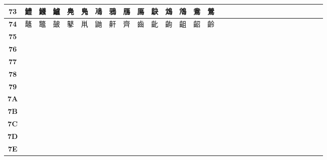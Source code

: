 \begin{table}[H]
\begin{tabular}{|Sc|Sc|Sc|Sc|Sc|Sc|Sc|Sc|Sc|Sc|Sc|Sc|Sc|Sc|Sc|}
\textbf{73} & 鱧 & 鱶 & 鱸 & 鳧 & 鳬 & 鳰 & 鴉 & 鴈 & 鳫 & 鴃 & 鴆 & 鴪 & 鴦 & 鶯 \\ \hline
\textbf{74} & 鼇 & 鼈 & 皷 & 鼕 & 鼡 & 鼬 & 鼾 & 齊 & 齒 & 齔 & 齣 & 齟 & 齠 & 齡 \\ \hline
\textbf{75} &  &  &  &  &  &  &  &  &  &  &  &  &  &  \\ \hline
\textbf{76} &  &  &  &  &  &  &  &  &  &  &  &  &  &  \\ \hline
\textbf{77} &  &  &  &  &  &  &  &  &  &  &  &  &  &  \\ \hline
\textbf{78} &  &  &  &  &  &  &  &  &  &  &  &  &  &  \\ \hline
\textbf{79} &  &  &  &  &  &  &  &  &  &  &  &  &  &  \\ \hline
\textbf{7A} &  &  &  &  &  &  &  &  &  &  &  &  &  &  \\ \hline
\textbf{7B} &  &  &  &  &  &  &  &  &  &  &  &  &  &  \\ \hline
\textbf{7C} &  &  &  &  &  &  &  &  &  &  &  &  &  &  \\ \hline
\textbf{7D} &  &  &  &  &  &  &  &  &  &  &  &  &  &  \\ \hline
\textbf{7E} &  &  &  &  &  &  &  &  &  &  &  &  &  &  \\ \hline
\end{tabular}
\end{table}

